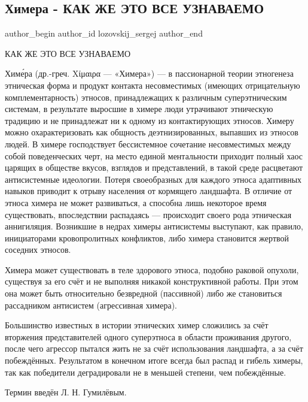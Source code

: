  
 
 
 
 
 
\subsection{Химера - КАК ЖЕ ЭТО ВСЕ УЗНАВАЕМО}
\label{sec:17_11_2019.fb.lozovskij_sergej.1.himera}
 
\ifcmt
 author_begin
   author_id lozovskij_sergej
 author_end
\fi

КАК ЖЕ ЭТО ВСЕ УЗНАВАЕМО

Химе́ра (др.-греч. Χίμαιρα — «Химера») — в пассионарной теории этногенеза
этническая форма и продукт контакта несовместимых (имеющих отрицательную
комплементарность) этносов, принадлежащих к различным суперэтническим системам,
в результате выросшие в химере люди утрачивают этническую традицию и не
принадлежат ни к одному из контактирующих этносов. Химеру можно
охарактеризовать как общность деэтнизированных, выпавших из этносов людей. В
химере господствует бессистемное сочетание несовместимых между собой
поведенческих черт, на место единой ментальности приходит полный хаос царящих в
обществе вкусов, взглядов и представлений, в такой среде расцветают
антисистемные идеологии. Потеря своеобразных для каждого этноса адаптивных
навыков приводит к отрыву населения от кормящего ландшафта. В отличие от этноса
химера не может развиваться, а способна лишь некоторое время существовать,
впоследствии распадаясь — происходит своего рода этническая аннигиляция.
Возникшие в недрах химеры антисистемы выступают, как правило, инициаторами
кровопролитных конфликтов, либо химера становится жертвой соседних этносов.

Химера может существовать в теле здорового этноса, подобно раковой опухоли,
существуя за его счёт и не выполняя никакой конструктивной работы. При этом она
может быть относительно безвредной (пассивной) либо же становиться рассадником
антисистем (агрессивная химера).

Большинство известных в истории этнических химер сложились за счёт вторжения
представителей одного суперэтноса в области проживания другого, после чего
агрессор пытался жить не за счёт использования ландшафта, а за счёт
побеждённых. Результатом в конечном итоге всегда был распад и гибель химеры,
так как победители деградировали не в меньшей степени, чем побеждённые.

Термин введён Л. Н. Гумилёвым.


